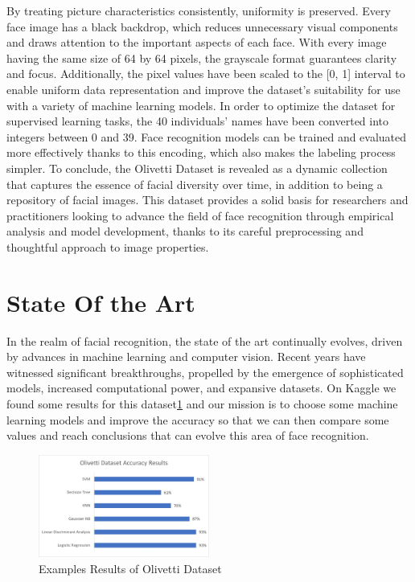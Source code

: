 \documentclass[12pt,a4paper,twocolumn]{article}
\begin{document}
By treating picture characteristics consistently, uniformity is preserved. Every face image has a black backdrop, which reduces unnecessary visual components and draws attention to the important aspects of each face. With every image having the same size of 64 by 64 pixels, the grayscale format guarantees clarity and focus. Additionally, the pixel values have been scaled to the [0, 1] interval to enable uniform data representation and improve the dataset's suitability for use with a variety of machine learning models. In order to optimize the dataset for supervised learning tasks, the 40 individuals' names have been converted into integers between 0 and 39. Face recognition models can be trained and evaluated more effectively thanks to this encoding, which also makes the labeling process simpler. To conclude, the Olivetti Dataset is revealed as a dynamic collection that captures the essence of facial diversity over time, in addition to being a repository of facial images. This dataset provides a solid basis for researchers and practitioners looking to advance the field of face recognition through empirical analysis and model development, thanks to its careful preprocessing and thoughtful approach to image properties.

\section{State Of the Art}


In the realm of facial recognition, the state of the art continually evolves, driven by advances in machine learning and computer vision. Recent years have witnessed significant breakthroughs, propelled by the emergence of sophisticated models, increased computational power, and expansive datasets.
On Kaggle\cite{facerecognition} we found some results for this dataset\ref{fig:results} and our mission is to choose some machine learning models and improve the accuracy so that we can then compare some values and reach conclusions that can evolve this area of face recognition.
\begin{figure}[H]
\centering
\includegraphics[width=0.5\textwidth]{images2/GraphicOD.jpg}
\caption{\label{fig:results} Examples Results of Olivetti Dataset}
\end{figure}
\end{document}
